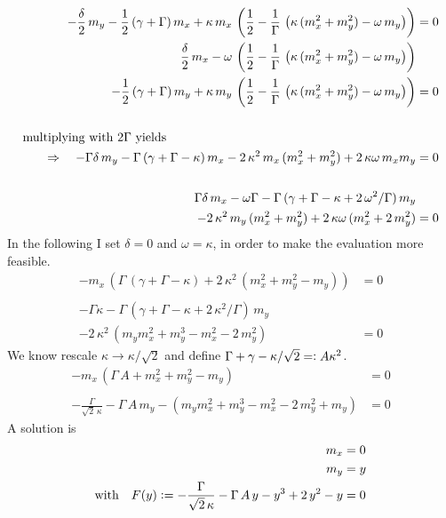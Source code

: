 \documentclass{article}
\begin{document}
\begin{align*}
    -\frac{\delta}{2}\,m_y-\half\,(\gamma+\Gamma)\,m_x+\kappa\,m_x\,\left( \half-\frac{1}{\Gamma}\,\left(\kappa\,(m_x^2+ m_y^2)-\omega\,m_y  \right)  \right)&=0\\
    \frac{\delta}{2}\,m_x-\omega\,\left( \half-\frac{1}{\Gamma}\,\left(\kappa\,(m_x^2+ m_y^2)-\omega\,m_y  \right)  \right)&\\-\half\,(\gamma+\Gamma)\,m_y+\kappa\,m_y\,\left( \half-\frac{1}{\Gamma}\,\left(\kappa\,(m_x^2+ m_y^2)-\omega\,m_y  \right)  \right)&=0\\\\
    \text{multiplying with }2\Gamma\text{ yields}\quad\quad\quad\hspace*{6cm}&
    \\\Rightarrow\quad-\Gamma\delta\,m_y-\Gamma\,(\gamma+\Gamma-\kappa)\,m_x-2\,\kappa^2\,m_x\,( m_x^2+ m_y^2)+2\,\kappa\omega\,m_xm_y  &=0\\\\
    \Gamma\delta\,m_x-\omega\Gamma-\Gamma\,(\gamma+\Gamma-\kappa+2\,\omega^2/\Gamma)\,m_y&\\
    -2\,\kappa^2\,m_y\,( m_x^2+ m_y^2)+2\,\kappa\omega\,(m_x^2+2\,m_y^2)  &=0
\end{align*}
In the following I set $\delta=0$ and $\omega=\kappa$, in order to make the evaluation more feasible.
\begin{align*}
    -m_x\,\left( \Gamma\,(\gamma+\Gamma-\kappa)+2\,\kappa^2\,\left( m_x^2+ m_y^2-m_y\right)\right)&=0\\\\ 
    -\Gamma\kappa-\Gamma\,(\gamma+\Gamma-\kappa+2\,\kappa^2/\Gamma)\,m_y&\\
    -2\,\kappa^2\,\left( m_ym_x^2+ m_y^3-m_x^2-2\,m_y^2\right) &=0
\end{align*}
We know rescale $\kappa\rightarrow\kappa/\sqrt{2}$ and define $\Gamma+\gamma-\kappa/\sqrt{2}=\vcentcolon A\kappa^2$.
\begin{align*}
    -m_x\,\left( \Gamma\,A+m_x^2 +m_y^2-m_y\right)&=0\\\\ 
    -\frac{\Gamma}{\sqrt{2}\,\kappa}-\Gamma\,A\,m_y-\left( m_ym_x^2+ m_y^3-m_x^2-2\,m_y^2+m_y\right) &=0
\end{align*}
A solution is
\begin{align*}
    m_x&=0\\
    m_y&=y\\
    \text{with}\quad F(y)\vcentcolon=-\frac{\Gamma}{\sqrt{2}\,\kappa}-\Gamma\,A\,y-y^3+2\,y^2-y &=0
\end{align*}
\end{document}
